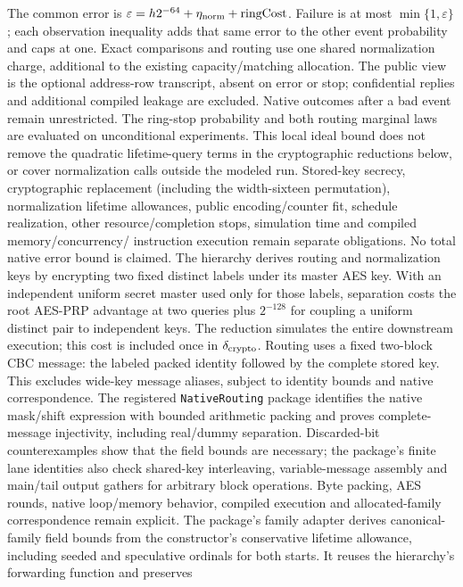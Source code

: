 \documentclass[11pt]{article}
\theoremstyle{definition}
\theoremstyle{remark}
\begin{document}
The common error is
$\varepsilon=h2^{-64}+\eta_{\rm norm}+\operatorname{ringCost}$.
Failure is at most $\min\{1,\varepsilon\}$; each observation inequality adds
that same error to the other event probability and caps at one. Exact
comparisons and routing use one shared normalization charge, additional to
the existing capacity/matching allocation. The public view is the optional
address-row transcript, absent on error or stop; confidential replies and
additional compiled leakage are excluded. Native outcomes after a bad event
remain unrestricted. The ring-stop probability and both routing marginal
laws are evaluated on unconditional experiments. This local ideal bound
does not remove the quadratic lifetime-query terms in the cryptographic
reductions below, or cover normalization calls outside the modeled run.
Stored-key secrecy, cryptographic
replacement (including the width-sixteen permutation), normalization lifetime
allowances, public encoding/counter fit, schedule realization, other
resource/completion stops, simulation time and compiled memory/concurrency/
instruction execution remain separate obligations. No total native error
bound is claimed. The hierarchy derives routing and normalization keys by
encrypting two fixed distinct labels under its master AES key. With an
independent uniform secret master used only for those labels, separation costs
the root AES-PRP advantage at two queries plus $2^{-128}$ for coupling a uniform
distinct pair to independent keys. The reduction simulates the entire
downstream execution; this cost is included once in $\delta_{\rm crypto}$.
Routing uses a fixed two-block
CBC message: the labeled packed identity followed by the complete stored key.
This excludes wide-key message aliases, subject to identity bounds
and native correspondence. The registered \texttt{NativeRouting} package
identifies the native mask/shift expression with bounded arithmetic packing
and proves complete-message injectivity, including real/dummy separation.
Discarded-bit counterexamples show that the field bounds are necessary;
the package's finite lane identities also check shared-key interleaving,
variable-message assembly and main/tail output gathers for arbitrary block
operations. Byte packing, AES rounds, native loop/memory behavior, compiled
execution and allocated-family correspondence remain explicit. The package's
family adapter derives canonical-family field bounds from the constructor's
conservative lifetime allowance, including seeded and speculative ordinals for
both starts. It reuses the hierarchy's forwarding function and preserves
\end{document}
